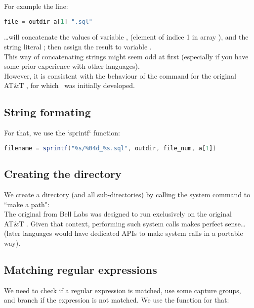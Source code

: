 For example the line:
\begin{lstlisting}[language=awk]
file = outdir a[1] ".sql"
\end{lstlisting}

\dots will concatenate the values of variable ,  (element of indice 1 in array ), and the string literal ; then assign the result to variable . \\

This way of concatenating strings might seem odd at first (especially if you have some prior experience with other languages). \\

However, it is consistent with the behaviour of the  command for the original AT\&T \Unix, for which \awk\ was initially developed.


\subsection*{String formating}

For that, we use the `sprintf` function:
\begin{lstlisting}[language=awk]
filename = sprintf("%s/%04d_%s.sql", outdir, file_num, a[1])
\end{lstlisting}




\subsection*{Creating the directory}

We create a directory (and all sub-directories) by calling the system command to ``make a path":  \\

The original  from Bell Labs was designed to run exclusively on the original AT\&T \Unix. Given that context, performing such system calls makes perfect sense\dots (later languages would have dedicated APIs to make system calls in a portable way).



\subsection*{Matching regular expressions}

We need to check if a regular expression is matched, use some capture groups, and branch if the expression is not matched. We use the  function for that:

